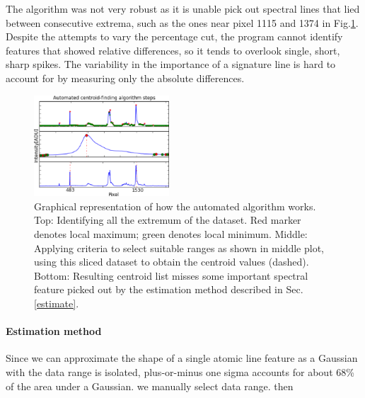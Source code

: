\documentclass[authoryear, 12pt,5p, times]{elsarticle}
\begin{document}
	The algorithm was not very robust as it is unable pick out spectral lines that lied between consecutive extrema, such as the ones near pixel 1115 and 1374 in Fig.\ref{fail}. Despite the attempts to vary the percentage cut, the program cannot identify features that showed relative differences, so it tends to overlook single, short, sharp spikes. The variability in the importance of a signature line  is hard to account for  by measuring only the  absolute differences.
\begin{figure}
\includegraphics[width=0.45\textwidth]{figures/steps}
\caption{Graphical representation of how the automated algorithm works. Top: Identifying all the extremum of the dataset. Red marker denotes local maximum; green denotes local minimum. Middle: Applying criteria to select suitable ranges as shown in middle plot, using this sliced dataset to obtain the centroid values (dashed). Bottom: Resulting centroid list misses some important spectral feature picked out by the estimation method  described in Sec.\ref{estimate}.}\label{fail}
\end{figure}
\paragraph*{\textbf{Estimation method}} 
Since we can approximate the shape of a single atomic line feature as a Gaussian with the data range is isolated, plus-or-minus one sigma accounts for about 68\% of the area under a Gaussian.
we manually select data range. then 
\label{estimate}
\end{document}
